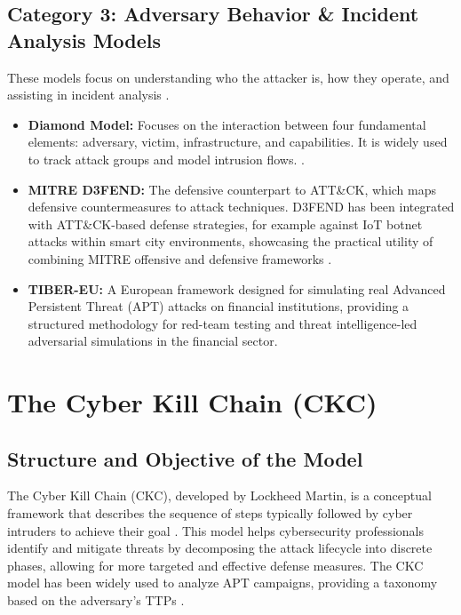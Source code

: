 \subsection{Category 3: Adversary Behavior \& Incident Analysis Models}
These models focus on understanding who the attacker is, how they operate, and assisting in incident analysis \cite{tatam2021review, huang2024security}.
\begin{itemize}
    \item \textbf{Diamond Model:} Focuses on the interaction between four fundamental elements: adversary, victim, infrastructure, and capabilities. It is widely used to track attack groups and model intrusion flows. \cite{tatam2021review, huang2024security}.
    \item \textbf{MITRE D3FEND:} The defensive counterpart to ATT\&CK, which maps defensive countermeasures to attack techniques. D3FEND has been integrated with ATT\&CK-based defense strategies, for example against IoT botnet attacks within smart city environments, showcasing the practical utility of combining MITRE offensive and defensive frameworks \cite{jiang2025mitre}.
    \item \textbf{TIBER-EU:} A European framework designed for simulating real Advanced Persistent Threat (APT) attacks on financial institutions, providing a structured methodology for red-team testing and threat intelligence-led adversarial simulations in the financial sector.
\end{itemize}


\section{The Cyber Kill Chain (CKC)}
\subsection{Structure and Objective of the Model}
The Cyber Kill Chain (CKC), developed by Lockheed Martin, is a conceptual framework that describes the sequence of steps typically followed by cyber intruders to achieve their goal \cite{singh2016comprehensive, ahmed2021cyber}. This model helps cybersecurity professionals identify and mitigate threats by decomposing the attack lifecycle into discrete phases, allowing for more targeted and effective defense measures. The CKC model has been widely used to analyze APT campaigns, providing a taxonomy based on the adversary's TTPs \cite{jiang2025mitre, ahmed2021cyber}.

